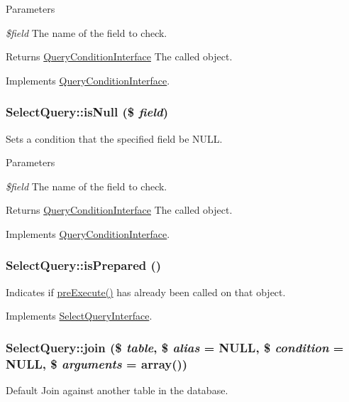 \begin{DoxyParams}{Parameters}
\item[{\em \$field}]The name of the field to check.\end{DoxyParams}
\begin{DoxyReturn}{Returns}
\hyperlink{interfaceQueryConditionInterface}{QueryConditionInterface} The called object. 
\end{DoxyReturn}


Implements \hyperlink{interfaceQueryConditionInterface_a8bbb6acc9c72911b165cf6eb1dc31453}{QueryConditionInterface}.\hypertarget{classSelectQuery_ab278e789f0e46f588f6d2c5cf030d3d8}{
\subsubsection[{isNull}]{\setlength{\rightskip}{0pt plus 5cm}SelectQuery::isNull (\$ {\em field})}}
\label{classSelectQuery_ab278e789f0e46f588f6d2c5cf030d3d8}
Sets a condition that the specified field be NULL.


\begin{DoxyParams}{Parameters}
\item[{\em \$field}]The name of the field to check.\end{DoxyParams}
\begin{DoxyReturn}{Returns}
\hyperlink{interfaceQueryConditionInterface}{QueryConditionInterface} The called object. 
\end{DoxyReturn}


Implements \hyperlink{interfaceQueryConditionInterface_a2978b536a3fe62b21e940366c9cb5923}{QueryConditionInterface}.\hypertarget{classSelectQuery_a12d7cb534e4178f404286468f4ad3321}{
\subsubsection[{isPrepared}]{\setlength{\rightskip}{0pt plus 5cm}SelectQuery::isPrepared ()}}
\label{classSelectQuery_a12d7cb534e4178f404286468f4ad3321}
Indicates if \hyperlink{classSelectQuery_a2b848ae6bd4c4e2059247a03b7ab6375}{preExecute()} has already been called on that object. 

Implements \hyperlink{interfaceSelectQueryInterface_a04f6707fd382218aef1443a9facbc9f2}{SelectQueryInterface}.\hypertarget{classSelectQuery_aceff7fc4040a74f693f2fc2548a99c17}{
\subsubsection[{join}]{\setlength{\rightskip}{0pt plus 5cm}SelectQuery::join (\$ {\em table}, \/  \$ {\em alias} = {\ttfamily NULL}, \/  \$ {\em condition} = {\ttfamily NULL}, \/  \$ {\em arguments} = {\ttfamily array()})}}
\label{classSelectQuery_aceff7fc4040a74f693f2fc2548a99c17}
Default Join against another table in the database.

